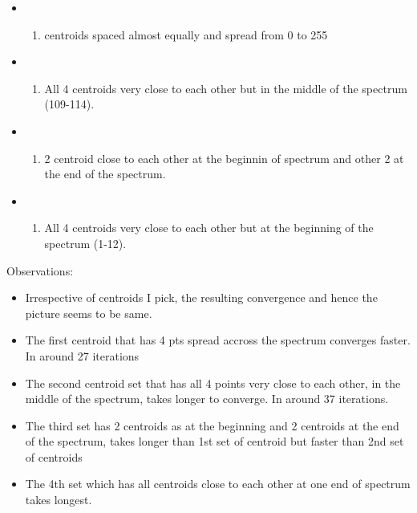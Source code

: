 \documentclass[11pt]{article}
\providecommand{\tightlist}{%
      \setlength{\itemsep}{0pt}\setlength{\parskip}{0pt}}
\begin{document}
\begin{itemize}
\item
  \begin{enumerate}
  \def\labelenumi{\arabic{enumi}.}
  \tightlist
  \item
    centroids spaced almost equally and spread from 0 to 255
  \end{enumerate}
\item
  \begin{enumerate}
  \def\labelenumi{\arabic{enumi}.}
  \setcounter{enumi}{1}
  \tightlist
  \item
    All 4 centroids very close to each other but in the middle of the
    spectrum (109-114).
  \end{enumerate}
\item
  \begin{enumerate}
  \def\labelenumi{\arabic{enumi}.}
  \setcounter{enumi}{2}
  \tightlist
  \item
    2 centroid close to each other at the beginnin of spectrum and other
    2 at the end of the spectrum.
  \end{enumerate}
\item
  \begin{enumerate}
  \def\labelenumi{\arabic{enumi}.}
  \setcounter{enumi}{3}
  \tightlist
  \item
    All 4 centroids very close to each other but at the beginning of the
    spectrum (1-12).
  \end{enumerate}
\end{itemize}

Observations:

\begin{itemize}
\tightlist
\item
  Irrespective of centroids I pick, the resulting convergence and hence
  the picture seems to be same.
\item
  The first centroid that has 4 pts spread accross the spectrum
  converges faster. In around 27 iterations
\item
  The second centroid set that has all 4 points very close to each
  other, in the middle of the spectrum, takes longer to converge. In
  around 37 iterations.
\item
  The third set has 2 centroids as at the beginning and 2 centroids at
  the end of the spectrum, takes longer than 1st set of centroid but
  faster than 2nd set of centroids
\item
  The 4th set which has all centroids close to each other at one end of
  spectrum takes longest.
\end{itemize}
\end{document}
